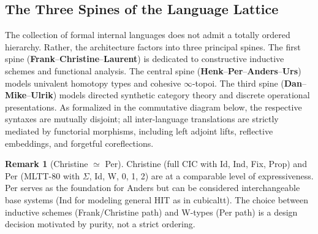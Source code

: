 \documentclass{article}
\theoremstyle{definition}
\newtheorem{remark}[definition]{Remark}
\theoremstyle{plain}
\begin{document}
\newpage
\subsection{The Three Spines of the Language Lattice}
The collection of formal internal languages does not admit a totally ordered hierarchy. Rather, the architecture factors into three principal spines. The first spine (\textbf{Frank}--\textbf{Christine}--\textbf{Laurent}) is dedicated to constructive inductive schemes and functional analysis. The central spine (\textbf{Henk}--\textbf{Per}--\textbf{Anders}--\textbf{Urs}) models univalent homotopy types and cohesive $\infty$-topoi. The third spine (\textbf{Dan}--\textbf{Mike}--\textbf{Ulrik}) models directed synthetic category theory and discrete operational presentations. As formalized in the commutative diagram below, the respective syntaxes are mutually disjoint; all inter-language translations are strictly mediated by functorial morphisms, including left adjoint lifts, reflective embeddings, and forgetful coreflections.

\begin{center}
\end{center}

\begin{remark}[Christine $\simeq$ Per]
Christine (full CIC with Id, Ind, Fix, Prop) and Per (MLTT-80 with
$\Sigma$, Id, W, 0, 1, 2) are at a comparable level of expressiveness. Per
serves as the foundation for Anders but can be considered interchangeable
base systems (Ind for modeling general HIT as in cubicaltt). The choice between inductive schemes (Frank/Christine path) and
W-types (Per path) is a design decision motivated by purity, not a strict ordering.
\end{remark}
\end{document}

